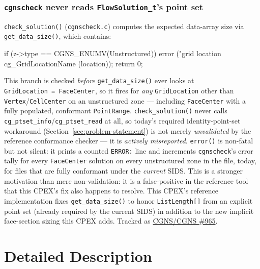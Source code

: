 \documentclass[11pt,letterpaper]{article}
\makeatletter
\let\cgns@orig@lstlisting\lstlisting
\let\cgns@endorig@lstlisting\endlstlisting
\renewenvironment{lstlisting}
  {\par\needspace{5\baselineskip}\nolinenumbers\cgns@orig@lstlisting}
  {\cgns@endorig@lstlisting\par\linenumbers}
\makeatother
\begin{document}
\subsubsection{\texttt{cgnscheck} never reads \texttt{FlowSolution\_t}'s point set}
\label{sec:cgnscheck_gap}

\texttt{check\_solution()} (\texttt{cgnscheck.c}) computes the expected
data-array size via \texttt{get\_data\_size()}, which contains:

\begin{lstlisting}[language=C]
if (z->type == CGNS_ENUMV(Unstructured)) {
    error ("grid location %s not valid for unstructured zone",
        cg_GridLocationName (location));
    return 0;
}
\end{lstlisting}

This branch is checked \emph{before} \texttt{get\_data\_size()} ever looks
at \texttt{GridLocation~=~FaceCenter}, so it fires for \emph{any}
\texttt{GridLocation} other than \texttt{Vertex}/\texttt{CellCenter} on an
unstructured zone --- including \texttt{FaceCenter} with a fully
populated, conformant \texttt{PointRange}. \texttt{check\_solution()}
never calls \texttt{cg\_ptset\_info}/\texttt{cg\_ptset\_read} at all, so
today's required identity-point-set workaround
(Section~\ref{sec:problem-statement}) is not merely \emph{unvalidated} by
the reference conformance checker --- it is \emph{actively misreported}.
\texttt{error()} is non-fatal but not silent: it prints a counted
\texttt{ERROR:} line and increments \texttt{cgnscheck}'s error tally for
every \texttt{FaceCenter} solution on every unstructured zone in the file,
today, for files that are fully conformant under the \emph{current} SIDS.
This is a stronger motivation than mere non-validation: it is a
false-positive in the reference tool that this CPEX's fix also happens to
resolve. This CPEX's reference implementation fixes
\texttt{get\_data\_size()} to honor \texttt{ListLength[]} from an explicit
point set (already required by the current SIDS) in addition to the new
implicit face-section sizing this CPEX adds. Tracked as
\href{https://github.com/CGNS/CGNS/issues/965}{CGNS/CGNS \#965}.

\section{Detailed Description}
\end{document}
